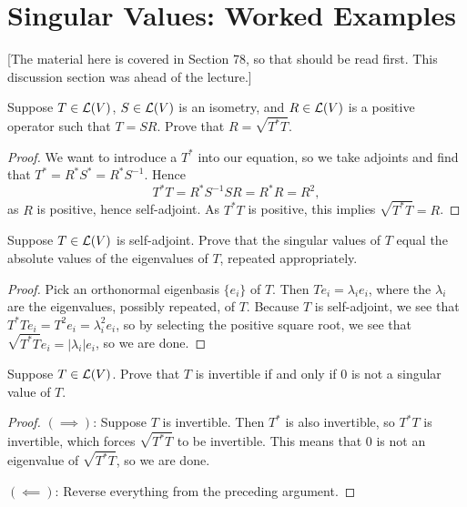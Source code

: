 \documentclass{article}
\begin{document}
\section{Singular Values: Worked Examples}

[The material here is covered in Section 78, so that should be read first. This discussion section was ahead of the lecture.]
\begin{example}
Suppose $T\in\mathcal L(V)$, $S\in\mathcal L(V)$ is an isometry, and $R\in\mathcal L(V)$ is a positive operator such that $T=SR$. Prove that $R=\sqrt{T^*T}$.
\end{example}
\begin{proof}
We want to introduce a $T^*$ into our equation, so we take adjoints and find that $T^* = R^*S^* = R^*S^{-1}$. Hence
$$T^*T = R^*S^{-1}SR = R^*R = R^2,$$
as $R$ is positive, hence self-adjoint. As $T^*T$ is positive, this implies $\sqrt{T^*T} = R$.
\end{proof}
\begin{example}
Suppose $T\in\mathcal L(V)$ is self-adjoint. Prove that the singular values of $T$ equal the absolute values of the eigenvalues of $T$, repeated appropriately.
\end{example}
\begin{proof}
Pick an orthonormal eigenbasis $\{e_i\}$ of $T$. Then $Te_i = \lambda_ie_i$, where the $\lambda_i$ are the eigenvalues, possibly repeated, of $T$. Because $T$ is self-adjoint, we see that $T^*Te_i = T^2e_i = \lambda_i^2e_i$, so by selecting the positive square root, we see that $\sqrt{T^*T}e_i = |\lambda_i|e_i$, so we are done.
\end{proof}
\begin{example}
Suppose $T\in\mathcal L(V)$. Prove that $T$ is invertible if and only if $0$ is not a singular value of $T$.
\end{example}
\begin{proof}
$(\implies)$: Suppose $T$ is invertible. Then $T^*$ is also invertible, so $T^*T$ is invertible, which forces $\sqrt{T^*T}$ to be invertible. This means that $0$ is not an eigenvalue of $\sqrt{T^*T}$, so we are done.

$(\impliedby)$: Reverse everything from the preceding argument.
\end{proof}
\end{document}
